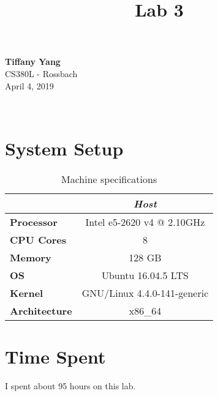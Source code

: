 \documentclass[a4paper]{article}
\title{Lab 3\vspace{-4ex}}
\author{} %
\date{}	%
\begin{document}
\noindent
\large\textbf{Tiffany Yang} \\
\normalsize CS380L - Rossbach\\
April 4, 2019{\vspace{-4ex}\\

\begingroup
\let\newpage\relax
\maketitle
\endgroup

\section{System Setup}


\begin{table}[htb!]
    \begin{center}
    \begin{tabular}{| l | c | }
        \hline
            & \textit{Host} \\ \hline \hline
            \textbf{Processor} & Intel e5-2620 v4 @ 2.10GHz \\ \hline
            \textbf{CPU Cores} & 8\\ \hline
            \textbf{Memory} & 128 GB\\ \hline
            \textbf{OS} & Ubuntu 16.04.5 LTS \\ \hline
            \textbf{Kernel} & GNU/Linux 4.4.0-141-generic \\ \hline

            \textbf{Architecture} & x86\_64 \\ \hline
        \hline
    \end{tabular}
    \caption{Machine specifications}\label{specs}
    \end{center}
    \end{table}



\section{Time Spent}

I spent about 95 hours on this lab.
\end{document}
